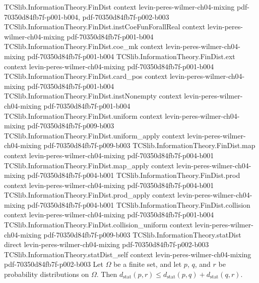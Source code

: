 \begin{theorem}
\label{TCSlib.InformationTheory.statDist_triangle}
\leanok
{}
\proofstep
  {TCSlib.InformationTheory.FinDist}
  {context}
  {levin-peres-wilmer-ch04-mixing}
  {pdf-70350d84fb7f-p001-b004,
    pdf-70350d84fb7f-p002-b003}
\proofstep
  {TCSlib.InformationTheory.FinDist.instCoeFunForallReal}
  {context}
  {levin-peres-wilmer-ch04-mixing}
  {pdf-70350d84fb7f-p001-b004}
\proofstep
  {TCSlib.InformationTheory.FinDist.coe_mk}
  {context}
  {levin-peres-wilmer-ch04-mixing}
  {pdf-70350d84fb7f-p001-b004}
\proofstep
  {TCSlib.InformationTheory.FinDist.ext}
  {context}
  {levin-peres-wilmer-ch04-mixing}
  {pdf-70350d84fb7f-p001-b004}
\proofstep
  {TCSlib.InformationTheory.FinDist.card_pos}
  {context}
  {levin-peres-wilmer-ch04-mixing}
  {pdf-70350d84fb7f-p001-b004}
\proofstep
  {TCSlib.InformationTheory.FinDist.instNonempty}
  {context}
  {levin-peres-wilmer-ch04-mixing}
  {pdf-70350d84fb7f-p001-b004}
\proofstep
  {TCSlib.InformationTheory.FinDist.uniform}
  {context}
  {levin-peres-wilmer-ch04-mixing}
  {pdf-70350d84fb7f-p009-b003}
\proofstep
  {TCSlib.InformationTheory.FinDist.uniform_apply}
  {context}
  {levin-peres-wilmer-ch04-mixing}
  {pdf-70350d84fb7f-p009-b003}
\proofstep
  {TCSlib.InformationTheory.FinDist.map}
  {context}
  {levin-peres-wilmer-ch04-mixing}
  {pdf-70350d84fb7f-p004-b001}
\proofstep
  {TCSlib.InformationTheory.FinDist.map_apply}
  {context}
  {levin-peres-wilmer-ch04-mixing}
  {pdf-70350d84fb7f-p004-b001}
\proofstep
  {TCSlib.InformationTheory.FinDist.prod}
  {context}
  {levin-peres-wilmer-ch04-mixing}
  {pdf-70350d84fb7f-p004-b001}
\proofstep
  {TCSlib.InformationTheory.FinDist.prod_apply}
  {context}
  {levin-peres-wilmer-ch04-mixing}
  {pdf-70350d84fb7f-p004-b001}
\proofstep
  {TCSlib.InformationTheory.FinDist.collision}
  {context}
  {levin-peres-wilmer-ch04-mixing}
  {pdf-70350d84fb7f-p001-b004}
\proofstep
  {TCSlib.InformationTheory.FinDist.collision_uniform}
  {context}
  {levin-peres-wilmer-ch04-mixing}
  {pdf-70350d84fb7f-p009-b003}
\proofstep
  {TCSlib.InformationTheory.statDist}
  {direct}
  {levin-peres-wilmer-ch04-mixing}
  {pdf-70350d84fb7f-p002-b003}
\proofstep
  {TCSlib.InformationTheory.statDist_self}
  {context}
  {levin-peres-wilmer-ch04-mixing}
  {pdf-70350d84fb7f-p002-b003}
Let $\Omega$ be a finite set, and let $p$, $q$, and $r$ be probability distributions on
$\Omega$. Then $d_{\mathrm{stat}}(p,r)\le
d_{\mathrm{stat}}(p,q)+d_{\mathrm{stat}}(q,r)$.
\end{theorem}

